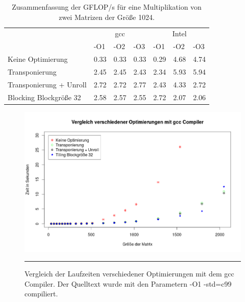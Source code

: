 \begin{table}[h]
  \begin{tabular}{l|l|l|l|l|l|l}
  & \multicolumn{3}{c|}{gcc} &                                      \multicolumn{3}{|c}{Intel} \\

                          & -O1    & -O2    & -O3    &  -O1   & -O2    & -O3 \\
                            \hline
  Keine Optimierung       & 0.33   & 0.33   & 0.33   &  0.29  & 4.68   & 4.74 \\
  Transponierung          & 2.45   & 2.45   & 2.43   &  2.34  & 5.93   & 5.94 \\
  Transponierung + Unroll & 2.72   & 2.72   & 2.77   &  2.43  & 4.33   & 2.72 \\
  Blocking Blockgröße 32  & 2.58   & 2.57   & 2.55   &  2.72  & 2.07   & 2.06 \\

  \hline
 \end{tabular}
  \caption{Zusammenfassung der GFLOP/s für eine Multiplikation von zwei Matrizen der Größe 1024.}
\end{table}

\begin{figure}[h]
\includegraphics[scale = 0.45]{Bilder/gccO1.png}
\caption{Vergleich der Laufzeiten verschiedener Optimierungen mit dem gcc Compiler. Der Quelltext wurde mit den Parametern -O1 -std=c99 compiliert.}
\noindent\rule{14cm}{0.4pt}
\label{gccO1}
\end{figure}

